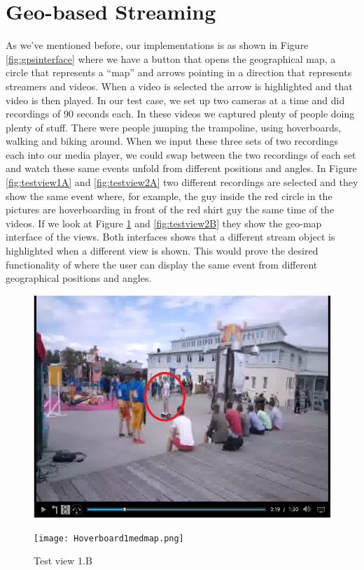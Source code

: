 \section{Geo-based Streaming}
\label{sec:geobasedstreaming}

As we’ve mentioned before, our implementations is as shown in Figure \ref{fig:gpsinterface} where we have a button that opens the geographical map, a circle that represents a “map” and arrows pointing in a direction that represents streamers and videos. When a video is selected the arrow is highlighted and that video is then played. In our test case, we set up two cameras at a time and did recordings of 90 seconds each. In these videos we captured plenty of people doing plenty of stuff. There were people jumping the trampoline, using hoverboards, walking and biking around. When we input these three sets of two recordings each into our media player, we could swap between the two recordings of each set and watch these same events unfold from different positions and angles. In Figure \ref{fig:testview1A} and \ref{fig:testview2A} two different recordings are selected and they show the same event where, for example, the guy inside the red circle in the pictures are hoverboarding in front of the red shirt guy the same time of the videos. If we look at Figure \ref{fig:testview1B} and \ref{fig:testview2B} they show the geo-map interface of the views. Both interfaces shows that a different stream object is highlighted when a different view is shown. This would prove the desired functionality of where the user can display the same event from different geographical positions and angles.

\begin{figure}[!htb]
  \includegraphics[width=\linewidth]{Hoverboard_1.png}
  \caption{Test view 1.A}\label{fig:testview1A}
\endminipage\hfill
\hspace{3px}
  \texttt{[image: Hoverboard1medmap.png]}
  \caption{Test view 1.B}\label{fig:testview1B}
\endminipage\hfill
\end{figure}

